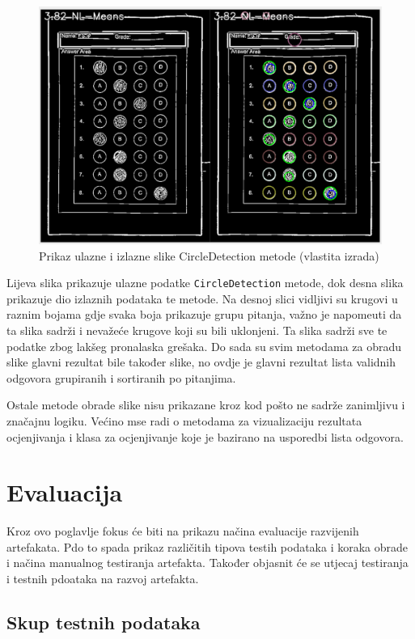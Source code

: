 \documentclass{foi}
\begin{document}
\begin{figure}[H]
\centering
\includegraphics[width=0.8\linewidth]{slike/CircleDetectionComp.png}
\caption{Prikaz ulazne i izlazne slike CircleDetection metode (vlastita izrada)}
\end{figure}

Lijeva slika prikazuje ulazne podatke \texttt{CircleDetection} metode, dok desna slika prikazuje dio izlaznih podataka te metode. Na desnoj slici vidljivi su krugovi u raznim bojama gdje svaka boja prikazuje grupu pitanja, važno je napomeuti da ta slika sadrži i nevažeće krugove koji su bili uklonjeni. Ta slika sadrži sve te podatke zbog lakšeg pronalaska grešaka. Do sada su svim metodama za obradu slike glavni rezultat bile također slike, no ovdje je glavni rezultat lista validnih odgovora grupiranih i sortiranih po pitanjima. 

Ostale metode obrade slike nisu prikazane kroz kod pošto ne sadrže zanimljivu i značajnu logiku. Većino mse radi o metodama za vizualizaciju rezultata ocjenjivanja i klasa za ocjenjivanje koje je bazirano na usporedbi lista odgovora.

\chapter{Evaluacija}

Kroz ovo poglavlje fokus će biti na prikazu načina evaluacije razvijenih artefakata. Pdo to spada prikaz različitih tipova testih podataka i koraka obrade i načina manualnog testiranja artefakta. Također objasnit će se utjecaj testiranja i testnih pdoataka na razvoj artefakta.
\section{Skup testnih podataka}
\end{document}
